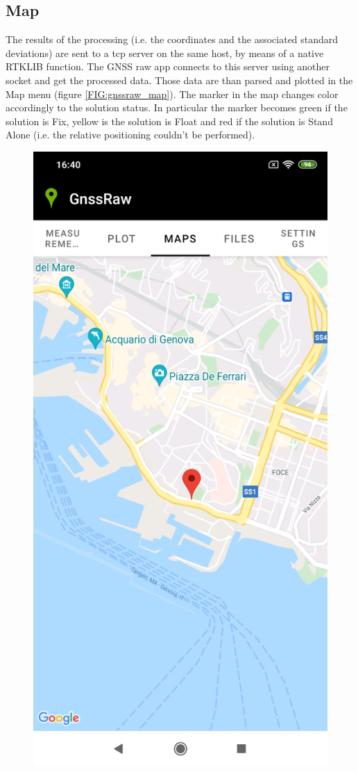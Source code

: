 \subsection*{Map}
 The results of the processing (i.e. the coordinates and the associated standard deviations) are sent to a tcp server on the same host, by means of a native RTKLIB function. The GNSS raw app connects to this server using another socket and get the processed data. Those data are than parsed and plotted in the Map menu (figure \ref{FIG:gnssraw_map}).   
The marker in the map changes color accordingly to the solution status. In particular the marker becomes green if the solution is Fix, yellow is the solution is Float and red if the solution is Stand Alone (i.e. the relative positioning couldn't be performed).

\begin{figure}[H] 
	\centering
	\includegraphics[scale=0.15,frame]{fig/gnssraw_maps.jpg} 

\end{figure}
